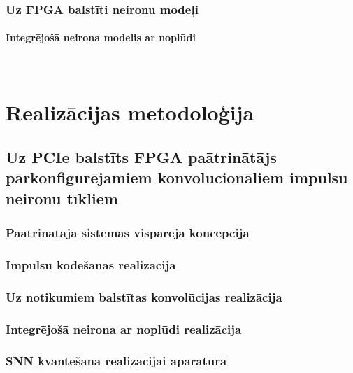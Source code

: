 \documentclass[a4paper, 12pt]{article}
\begin{document}
    \subsubsection{Uz FPGA balstīti neironu modeļi}
      \paragraph{Integrējošā neirona modelis ar noplūdi}\mbox{} \\
      
\section{Realizācijas metodoloģija} \label{sec:impl}

\subsection{Uz PCIe balstīts FPGA paātrinātājs pārkonfigurējamiem konvolucionāliem impulsu neironu tīkliem} \label{sec:fpga_impl} %
  \subsubsection{Paātrinātāja sistēmas vispārējā koncepcija} %
  
  \subsubsection{Impulsu kodēšanas realizācija}
  
  \subsubsection{Uz notikumiem balstītas konvolūcijas realizācija}
  
  \subsubsection{Integrējošā neirona ar noplūdi realizācija}
  
  \subsubsection{SNN kvantēšana realizācijai aparatūrā}
  
\end{document}
